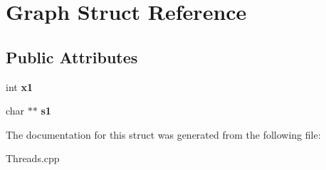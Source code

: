 \hypertarget{structGraph}{\section{Graph Struct Reference}
\label{structGraph}
}
\subsection*{Public Attributes}
\begin{DoxyCompactItemize}
\item 
\hypertarget{structGraph_a9dd4ae568a6d821eb75f2ed958475090}{int {\bfseries x1}}\label{structGraph_a9dd4ae568a6d821eb75f2ed958475090}

\item 
\hypertarget{structGraph_a7e796504e921c0d9cb144c589f3f48bb}{char $\ast$$\ast$ {\bfseries s1}}\label{structGraph_a7e796504e921c0d9cb144c589f3f48bb}

\end{DoxyCompactItemize}


The documentation for this struct was generated from the following file\+:\begin{DoxyCompactItemize}
\item 
Threads.\+cpp\end{DoxyCompactItemize}
